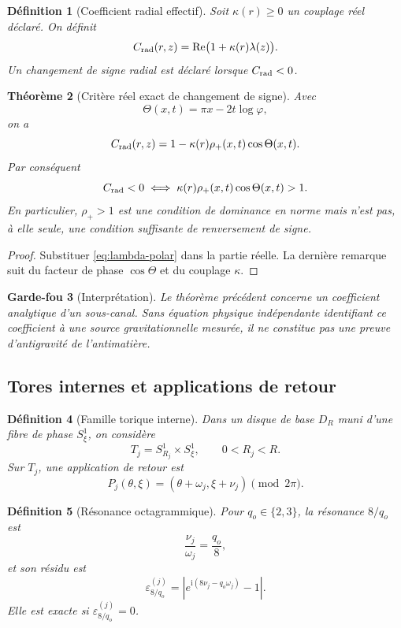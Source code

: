 \documentclass[11pt,a4paper]{article}
\newtheorem{theorem}{Théorème}[section]
\newtheorem{definition}[theorem]{Définition}
\newtheorem{guardrail}[theorem]{Garde-fou}
\newcommand{\ii}{\mathrm i}
\newcommand{\ph}{\varphi}
\newcommand{\eps}{\varepsilon}
\newcommand{\Rea}{\operatorname{Re}}
\begin{document}
\begin{definition}[Coefficient radial effectif]
Soit $\kappa(r)\ge0$ un couplage réel déclaré. On définit
\[
 C_{\rm rad}(r,z)=\Rea\bigl(1+\kappa(r)\lambda(z)\bigr).
\]
Un changement de signe radial est déclaré lorsque $C_{\rm rad}<0$.
\end{definition}

\begin{theorem}[Critère réel exact de changement de signe]\label{thm:sign}
Avec
\[
 \Theta(x,t)=\pi x-2t\log\ph,
\]
on a
\begin{equation}\label{eq:Crad-explicit}
 C_{\rm rad}(r,z)=1-\kappa(r)\rho_+(x,t)\cos\Theta(x,t).
\end{equation}
Par conséquent
\[
 C_{\rm rad}<0
 \iff
 \kappa(r)\rho_+(x,t)\cos\Theta(x,t)>1.
\]
En particulier, $\rho_+>1$ est une condition de dominance en norme mais n'est pas, à elle seule, une condition suffisante de renversement de signe.
\end{theorem}

\begin{proof}
Substituer \eqref{eq:lambda-polar} dans la partie réelle. La dernière remarque suit du facteur de phase $\cos\Theta$ et du couplage $\kappa$.
\end{proof}

\begin{guardrail}[Interprétation]
Le théorème précédent concerne un coefficient analytique d'un sous-canal. Sans équation physique indépendante identifiant ce coefficient à une source gravitationnelle mesurée, il ne constitue pas une preuve d'antigravité de l'antimatière.
\end{guardrail}

\subsection{Tores internes et applications de retour}

\begin{definition}[Famille torique interne]
Dans un disque de base $D_R$ muni d'une fibre de phase $S^1_\xi$, on considère
\[
 T_j=S^1_{R_j}\times S^1_\xi,
 \qquad 0<R_j<R.
\]
Sur $T_j$, une application de retour est
\[
 P_j(\theta,\xi)=(\theta+\omega_j,\xi+\nu_j)\pmod{2\pi}.
\]
\end{definition}

\begin{definition}[Résonance octagrammique]
Pour $q_o\in\{2,3\}$, la résonance $8/q_o$ est
\[
 \frac{\nu_j}{\omega_j}=\frac{q_o}{8},
\]
et son résidu est
\[
 \eps_{8/q_o}^{(j)}=
 \left|e^{\ii(8\nu_j-q_o\omega_j)}-1\right|.
\]
Elle est exacte si $\eps_{8/q_o}^{(j)}=0$.
\end{definition}
\end{document}
